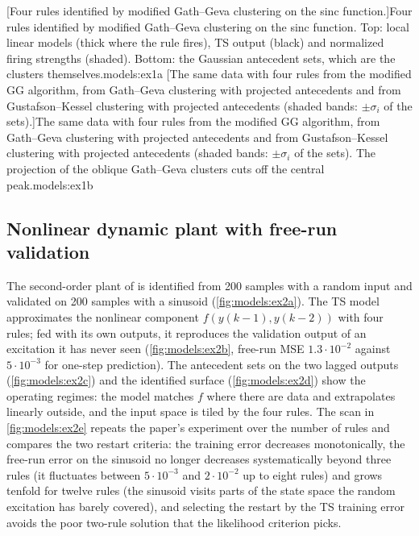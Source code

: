 [Four rules identified by modified Gath--Geva clustering on the sinc function.]{Four rules identified by modified Gath--Geva clustering on the sinc function. Top: local linear models (thick where the rule fires), TS output (black) and normalized firing strengths (shaded). Bottom: the Gaussian antecedent sets, which are the clusters themselves.}{models:ex1a}
[The same data with four rules from the modified GG algorithm, from Gath--Geva clustering with projected antecedents and from Gustafson--Kessel clustering with projected antecedents (shaded bands: $\pm\sigma_i$ of the sets).]{The same data with four rules from the modified GG algorithm, from Gath--Geva clustering with projected antecedents and from Gustafson--Kessel clustering with projected antecedents (shaded bands: $\pm\sigma_i$ of the sets). The projection of the oblique Gath--Geva clusters cuts off the central peak.}{models:ex1b}

\subsection{Nonlinear dynamic plant with free-run validation}

The second-order plant of \cite{abonyi:2002:mgg} is identified from 200 samples with a random input and validated on 200 samples with a sinusoid (\cref{fig:models:ex2a}). The TS model approximates the nonlinear component $f(y(k-1),y(k-2))$ with four rules; fed with its own outputs, it reproduces the validation output of an excitation it has never seen (\cref{fig:models:ex2b}, free-run MSE $1.3\cdot10^{-2}$ against $5\cdot10^{-3}$ for one-step prediction). The antecedent sets on the two lagged outputs (\cref{fig:models:ex2c}) and the identified surface (\cref{fig:models:ex2d}) show the operating regimes: the model matches $f$ where there are data and extrapolates linearly outside, and the input space is tiled by the four rules. The scan in \cref{fig:models:ex2e} repeats the paper's experiment over the number of rules and compares the two restart criteria: the training error decreases monotonically, the free-run error on the sinusoid no longer decreases systematically beyond three rules (it fluctuates between $5\cdot10^{-3}$ and $2\cdot10^{-2}$ up to eight rules) and grows tenfold for twelve rules (the sinusoid visits parts of the state space the random excitation has barely covered), and selecting the restart by the TS training error avoids the poor two-rule solution that the likelihood criterion picks.

